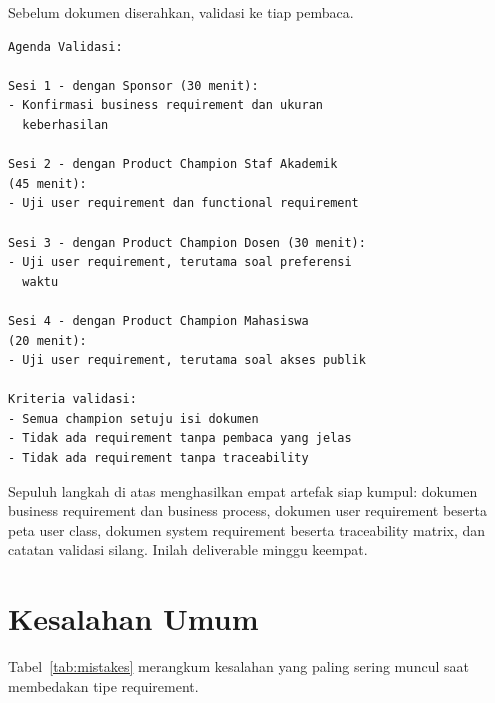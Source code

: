 \documentclass[11pt,a4paper]{article}
\begin{document}
Sebelum dokumen diserahkan, validasi ke tiap pembaca.

\begin{lstlisting}[style=out]
Agenda Validasi:

Sesi 1 - dengan Sponsor (30 menit):
- Konfirmasi business requirement dan ukuran
  keberhasilan

Sesi 2 - dengan Product Champion Staf Akademik
(45 menit):
- Uji user requirement dan functional requirement

Sesi 3 - dengan Product Champion Dosen (30 menit):
- Uji user requirement, terutama soal preferensi
  waktu

Sesi 4 - dengan Product Champion Mahasiswa
(20 menit):
- Uji user requirement, terutama soal akses publik

Kriteria validasi:
- Semua champion setuju isi dokumen
- Tidak ada requirement tanpa pembaca yang jelas
- Tidak ada requirement tanpa traceability
\end{lstlisting}

Sepuluh langkah di atas menghasilkan empat artefak siap kumpul: dokumen business requirement dan business process, dokumen user requirement beserta peta user class, dokumen system requirement beserta traceability matrix, dan catatan validasi silang. Inilah deliverable minggu keempat.

\section{Kesalahan Umum}

Tabel~\ref{tab:mistakes} merangkum kesalahan yang paling sering muncul saat membedakan tipe requirement.
\end{document}
